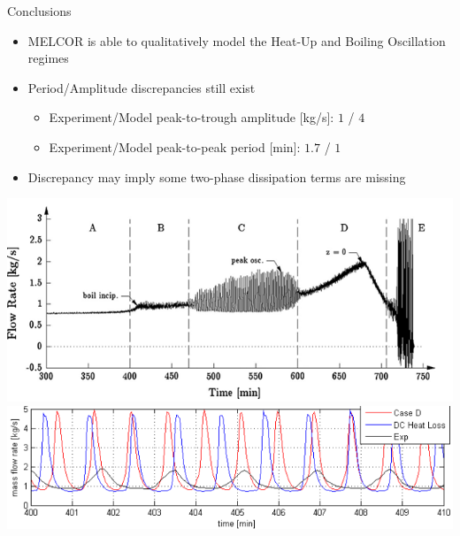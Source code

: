 \documentclass[10pt,t,xcolor=table]{UWMadBeamer}
\begin{document}
\begin{frame} {Conclusions}
    \begin{itemize}
        \item MELCOR is able to qualitatively model the Heat-Up and Boiling Oscillation regimes
        \item Period/Amplitude discrepancies still exist
        \begin{itemize}
            \item Experiment/Model peak-to-trough amplitude [kg/s]: $1$ / $4$
            \item Experiment/Model peak-to-peak period [min]: $1.7$ / $1$
        \end{itemize}
        \item Discrepancy may imply some two-phase dissipation terms are missing
    \end{itemize}
    \vfill
    {
    \centering
    \includegraphics[height=0.24\paperheight]{BoilingRegimes}%
    \hfill
    \includegraphics[keepaspectratio=false,width=0.5\paperwidth,height=0.25\paperheight]{Comparison_Piping2}%
    \hfill
    }
\end{frame}
\end{document}
